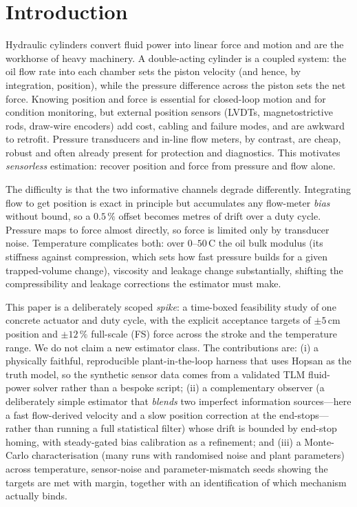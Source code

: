 \documentclass[conference]{IEEEtran}
\begin{document}
\section{Introduction}
Hydraulic cylinders convert fluid power into linear force and motion and are the
workhorse of heavy machinery. A double-acting cylinder is a coupled system: the
oil flow rate into each chamber sets the piston velocity (and hence, by
integration, position), while the pressure difference across the piston sets the
net force. Knowing position and force is essential for closed-loop motion and for
condition monitoring, but external position sensors (LVDTs, magnetostrictive
rods, draw-wire encoders) add cost, cabling and failure modes, and are awkward to
retrofit. Pressure transducers and in-line flow meters, by contrast, are cheap,
robust and often already present for protection and diagnostics. This motivates
\emph{sensorless} estimation: recover position and force from pressure and flow
alone.

The difficulty is that the two informative channels degrade differently.
Integrating flow to get position is exact in principle but accumulates any
flow-meter \emph{bias} without bound, so a $0.5\,\%$ offset becomes metres of
drift over a duty cycle. Pressure maps to force almost directly, so force is
limited only by transducer noise. Temperature complicates both: over
$0$--$50\,$\textdegree C the oil bulk modulus (its stiffness against compression,
which sets how fast pressure builds for a given trapped-volume change), viscosity
and leakage change substantially, shifting the compressibility and leakage
corrections the estimator must make.

This paper is a deliberately scoped \emph{spike}: a time-boxed feasibility study
of one concrete actuator and duty cycle, with the explicit acceptance targets of
$\pm 5$\,cm position and $\pm 12\,\%$ full-scale (FS) force across the stroke and
the temperature range. We do not claim a new estimator class. The contributions
are: (i) a physically faithful, reproducible plant-in-the-loop harness that uses
Hopsan as the truth model, so the synthetic sensor data comes from a validated
TLM fluid-power solver rather than a bespoke script; (ii)
a complementary observer (a deliberately simple estimator that \emph{blends} two
imperfect information sources---here a fast flow-derived velocity and a slow
position correction at the end-stops---rather than running a full statistical
filter) whose drift is bounded by end-stop homing, with steady-gated bias
calibration as a refinement; and (iii) a Monte-Carlo characterisation (many runs
with randomised noise and plant parameters) across temperature, sensor-noise and
parameter-mismatch seeds showing the targets are met with margin, together with an
identification of which mechanism actually binds.
\end{document}
